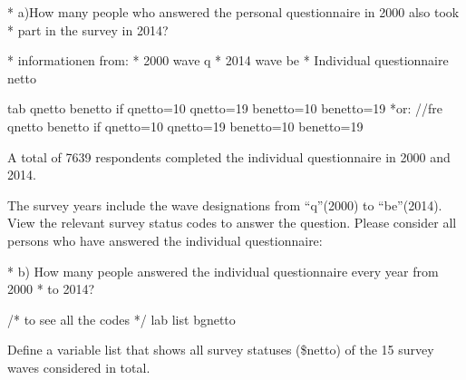 \documentclass[letterpaper,10pt,openany,onesideH,english]{sphinxmanual}
\begin{document}
%
\begin{sphinxVerbatim}[commandchars=\\\{\},numbers=left,firstnumber=1,stepnumber=1]
* a)How many people who answered the personal questionnaire in 2000 also took 
*   part in the survey in 2014?

* informationen from:
*	2000 \PYGZhy{}\PYGZgt{} wave q
*  	2014 \PYGZhy{}\PYGZgt{} wave be     
* 	Individual questionnaire \PYGZhy{}\PYGZgt{} \PYGZdl{}netto

tab qnetto benetto  if qnetto\PYGZgt{}=10 \PYGZam{} qnetto\PYGZlt{}=19 \PYGZam{} benetto\PYGZgt{}=10 \PYGZam{} benetto\PYGZlt{}=19
*or:
//fre qnetto benetto  if qnetto\PYGZgt{}=10 \PYGZam{} qnetto\PYGZlt{}=19 \PYGZam{} benetto\PYGZgt{}=10 \PYGZam{} benetto\PYGZlt{}=19
\end{sphinxVerbatim}

\begin{figure}[H]
\centering

\noindent{}
\end{figure}

A total of 7639 respondents completed the individual questionnaire in 2000 and 2014.


The survey years include the wave designations from “q”(2000) to “be”(2014).
View the relevant survey status codes to answer the question. Please consider all persons who have answered the individual questionnaire:

%
\begin{sphinxVerbatim}[commandchars=\\\{\},numbers=left,firstnumber=1,stepnumber=1]
* b) How many people answered the individual questionnaire every year from 2000 
*    to 2014?

/* to see all the codes */
lab list bgnetto
\end{sphinxVerbatim}

\begin{figure}[H]
\centering

\noindent{}
\end{figure}

Define a variable list that shows all survey statuses (\$netto) of the 15 survey waves considered in total.
\end{document}
